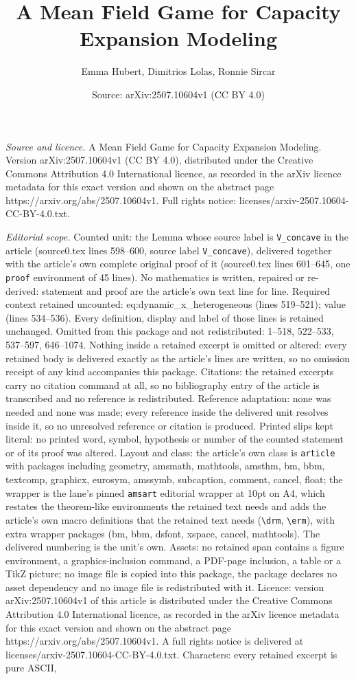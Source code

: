 \documentclass[10pt,a4paper]{amsart}
\title[A Mean Field Game for Capacity Expansion Modeling]{A Mean Field Game for Capacity Expansion Modeling}
\author{Emma Hubert, Dimitrios Lolas, Ronnie Sircar}
\date{Source: arXiv:2507.10604v1 (CC BY 4.0)}
\begin{document}
\maketitle

\noindent\emph{Source and licence.} A Mean Field Game for Capacity Expansion Modeling. Version arXiv:2507.10604v1 (CC BY 4.0), distributed under the Creative Commons Attribution 4.0 International licence, as recorded in the arXiv licence metadata for this exact version and shown on the abstract page https://arxiv.org/abs/2507.10604v1. Full rights notice: licenses/arxiv-2507.10604-CC-BY-4.0.txt.\par\smallskip

\noindent\textit{Editorial scope.} Counted unit: the Lemma whose source label is \texttt{V\_concave} in the article (source0.tex lines 598--600, source label \texttt{V\_concave}), delivered together with the article's own complete original proof of it (source0.tex lines 601--645, one \texttt{proof} environment of 45 lines). No mathematics is written, repaired or re-derived: statement and proof are the article's own text line for line. Required context retained uncounted: eq:dynamic\_x\_heterogeneous (lines 519--521); value (lines 534--536). Every definition, display and label of those lines is retained unchanged. Omitted from this package and not redistributed: 1--518, 522--533, 537--597, 646--1074. Nothing inside a retained excerpt is omitted or altered: every retained body is delivered exactly as the article's lines are written, so no omission receipt of any kind accompanies this package. Citations: the retained excerpts carry no citation command at all, so no bibliography entry of the article is transcribed and no reference is redistributed. Reference adaptation: none was needed and none was made; every reference inside the delivered unit resolves inside it, so no unresolved reference or citation is produced. Printed slips kept literal: no printed word, symbol, hypothesis or number of the counted statement or of its proof was altered. Layout and class: the article's own class is \texttt{article} with packages including geometry, amsmath, mathtools, amsthm, bm, bbm, textcomp, graphicx, eurosym, amssymb, subcaption, comment, cancel, float; the wrapper is the lane's pinned \texttt{amsart} editorial wrapper at 10pt on A4, which restates the theorem-like environments the retained text needs and adds the article's own macro definitions that the retained text needs (\texttt{\textbackslash drm}, \texttt{\textbackslash erm}), with extra wrapper packages (bm, bbm, dsfont, xspace, cancel, mathtools). The delivered numbering is the unit's own. Assets: no retained span contains a figure environment, a graphics-inclusion command, a PDF-page inclusion, a table or a TikZ picture; no image file is copied into this package, the package declares no asset dependency and no image file is redistributed with it. Licence: version arXiv:2507.10604v1 of this article is distributed under the Creative Commons Attribution 4.0 International licence, as recorded in the arXiv licence metadata for this exact version and shown on the abstract page https://arxiv.org/abs/2507.10604v1. A full rights notice is delivered at licenses/arxiv-2507.10604-CC-BY-4.0.txt. Characters: every retained excerpt is pure ASCII, 
\end{document}
